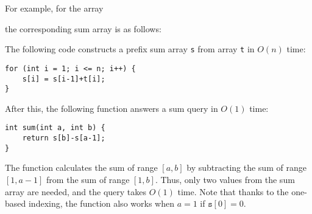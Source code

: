For example, for the array
\begin{center}
\end{center}
the corresponding sum array is as follows:
\begin{center}
\end{center}
The following code constructs a prefix sum
array \texttt{s} from array \texttt{t} in $O(n)$ time:
\begin{lstlisting}
for (int i = 1; i <= n; i++) {
    s[i] = s[i-1]+t[i];
}
\end{lstlisting}
After this, the following function answers
a sum query in $O(1)$ time:
\begin{lstlisting}
int sum(int a, int b) {
    return s[b]-s[a-1];
}
\end{lstlisting}

The function calculates the sum of range $[a,b]$
by subtracting the sum of range $[1,a-1]$
from the sum of range $[1,b]$.
Thus, only two values from the sum array
are needed, and the query takes $O(1)$ time.
Note that thanks to the one-based indexing,
the function also works when $a=1$ if $\texttt{s}[0]=0$. 

